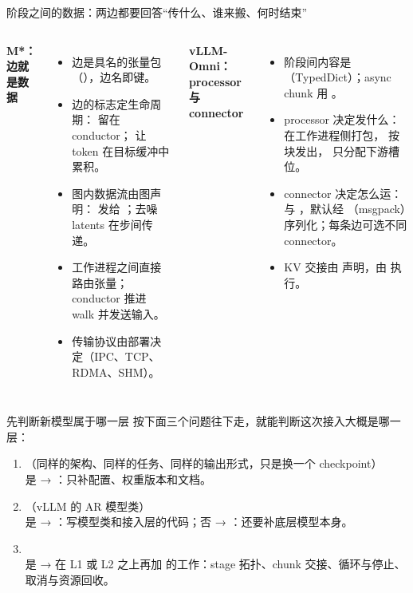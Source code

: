 \begin{frame}[t]{阶段之间的数据：两边都要回答“传什么、谁来搬、何时结束”}
\small
\begin{columns}[T,onlytextwidth]
  \textbf{M*：边就是数据}
  \begin{itemize}\setlength\itemsep{3pt}
    \item 边是具名的张量包（），边名即键。
    \item 边的标志定生命周期： 留在 conductor； 让 token 在目标缓冲中累积。
    \item 图内数据流由图声明： 发给 ；去噪 latents 在步间传递。
    \item 工作进程之间直接路由张量；conductor 推进 walk 并发送输入。
    \item 传输协议由部署决定（IPC、TCP、RDMA、SHM）。
  \end{itemize}
  \textbf{vLLM-Omni：processor 与 connector}
  \begin{itemize}\setlength\itemsep{3pt}
    \item 阶段间内容是 （TypedDict）；async chunk 用 。
    \item processor 决定发什么： 在工作进程侧打包， 按块发出， 只分配下游槽位。
    \item connector 决定怎么运： 与 ，默认经 （msgpack）序列化；每条边可选不同 connector。
    \item KV 交接由  声明，由  执行。
  \end{itemize}
\end{columns}
\end{frame}

\begin{frame}[t]{先判断新模型属于哪一层}
\small
按下面三个问题往下走，就能判断这次接入大概是哪一层：
\begin{enumerate}
  \item {}（同样的架构、同样的任务、同样的输出形式，只是换一个 checkpoint）\\
  是 → ：只补配置、权重版本和文档。
  \item {}（vLLM 的 AR 模型类）\\
  是 → ：写模型类和接入层的代码；否 → ：还要补底层模型本身。
  \item {}\\
  是 → 在 L1 或 L2 之上再加  的工作：stage 拓扑、chunk 交接、循环与停止、取消与资源回收。
\end{enumerate}
\vspace{4pt}
\end{frame}

